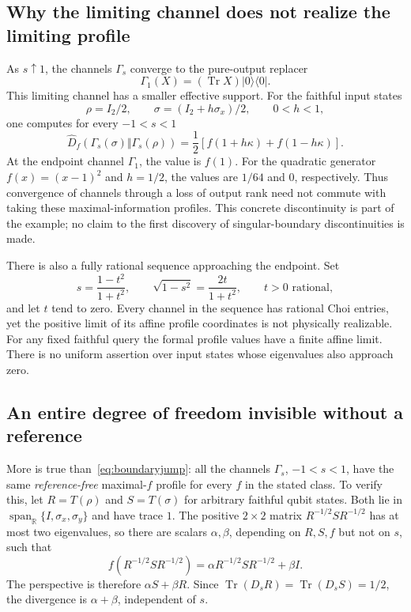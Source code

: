 \documentclass[11pt,a4paper]{article}
\theoremstyle{definition}\newtheorem{definition}[theorem]{Definition}
\newcommand{\Tr}{\operatorname{Tr}}
\newcommand{\spanR}{\operatorname{span}_{\mathbb R}}
\newcommand{\Dhat}{\widehat D}
\begin{document}
\subsection{Why the limiting channel does not realize the limiting profile}

As $s\uparrow1$, the channels $\Gamma_s$ converge to the pure-output replacer
\[
 \Gamma_1(X)=(\Tr X)|0\rangle\langle0|.
\]
This limiting channel has a smaller effective support. For the faithful input states
\[
 \rho=I_2/2,\qquad \sigma=(I_2+h\sigma_x)/2,\qquad 0<h<1,
\]
one computes for every $-1<s<1$
\begin{equation}\label{eq:boundaryjump}
 \Dhat_f(\Gamma_s(\sigma)\Vert\Gamma_s(\rho))
 =\frac12\left[f(1+h\kappa)+f(1-h\kappa)\right].
\end{equation}
At the endpoint channel $\Gamma_1$, the value is $f(1)$. For the quadratic generator $f(x)=(x-1)^2$ and $h=1/2$, the values are $1/64$ and $0$, respectively. Thus convergence of channels through a loss of output rank need not commute with taking these maximal-information profiles. This concrete discontinuity is part of the example; no claim to the first discovery of singular-boundary discontinuities is made.

There is also a fully rational sequence approaching the endpoint. Set
\[
 s=\frac{1-t^2}{1+t^2},\qquad
 \sqrt{1-s^2}=\frac{2t}{1+t^2},\qquad t>0\text{ rational},
\]
and let $t$ tend to zero. Every channel in the sequence has rational Choi entries, yet the positive limit of its affine profile coordinates is not physically realizable. For any fixed faithful query the formal profile values have a finite affine limit. There is no uniform assertion over input states whose eigenvalues also approach zero.

\subsection{An entire degree of freedom invisible without a reference}

More is true than~\eqref{eq:boundaryjump}: all the channels $\Gamma_s$, $-1<s<1$, have the same \emph{reference-free} maximal-$f$ profile for every $f$ in the stated class. To verify this, let $R=T(\rho)$ and $S=T(\sigma)$ for arbitrary faithful qubit states. Both lie in $\spanR\{I,\sigma_x,\sigma_y\}$ and have trace $1$. The positive $2\times2$ matrix $R^{-1/2}SR^{-1/2}$ has at most two eigenvalues, so there are scalars $\alpha,\beta$, depending on $R,S,f$ but not on $s$, such that
\[
 f(R^{-1/2}SR^{-1/2})=\alpha R^{-1/2}SR^{-1/2}+\beta I.
\]
The perspective is therefore $\alpha S+\beta R$. Since $\Tr(D_sR)=\Tr(D_sS)=1/2$, the divergence is $\alpha+\beta$, independent of $s$.
\end{document}
